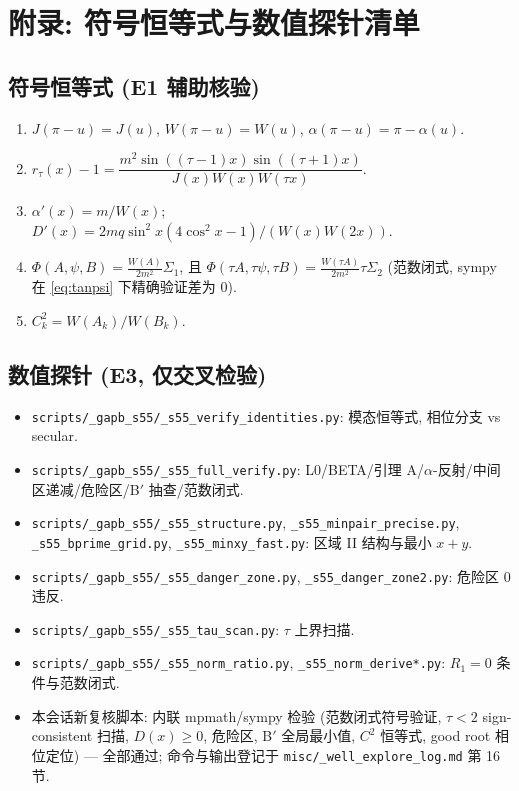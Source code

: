 \documentclass[UTF8]{ctexart}
\begin{document}
\section{附录: 符号恒等式与数值探针清单}\label{app:verify}

\subsection{符号恒等式 (E1 辅助核验)}

\begin{enumerate}
	\item $J(\pi-u)=J(u)$, $W(\pi-u)=W(u)$, $\alpha(\pi-u)=\pi-\alpha(u)$.
	\item $r_\tau(x)-1=\dfrac{m^2\sin((\tau-1)x)\sin((\tau+1)x)}{J(x)W(x)W(\tau x)}$.
	\item $\alpha'(x)=m/W(x)$; $D'(x)=2mq\sin^2x(4\cos^2x-1)/(W(x)W(2x))$.
	\item $\Phi(A,\psi,B)=\frac{W(A)}{2m^2}\Sigma_1$, 且
		$\Phi(\tau A,\tau\psi,\tau B)=\frac{W(\tau A)}{2m^2}\tau\Sigma_2$
		(范数闭式, sympy 在 \eqref{eq:tanpsi} 下精确验证差为 0).
	\item $C_k^2=W(A_k)/W(B_k)$.
\end{enumerate}

\subsection{数值探针 (E3, 仅交叉检验)}

\begin{itemize}
	\item \texttt{scripts/\_gapb\_s55/\_s55\_verify\_identities.py}: 模态恒等式,
		相位分支 vs secular.
	\item \texttt{scripts/\_gapb\_s55/\_s55\_full\_verify.py}: L0/BETA/引理
		A/$\alpha$-反射/中间区递减/危险区/B$'$ 抽查/范数闭式.
	\item \texttt{scripts/\_gapb\_s55/\_s55\_structure.py},
		\texttt{\_s55\_minpair\_precise.py}, \texttt{\_s55\_bprime\_grid.py},
		\texttt{\_s55\_minxy\_fast.py}: 区域 II 结构与最小 $x+y$.
	\item \texttt{scripts/\_gapb\_s55/\_s55\_danger\_zone.py},
		\texttt{\_s55\_danger\_zone2.py}: 危险区 0 违反.
	\item \texttt{scripts/\_gapb\_s55/\_s55\_tau\_scan.py}: $\tau$ 上界扫描.
	\item \texttt{scripts/\_gapb\_s55/\_s55\_norm\_ratio.py},
		\texttt{\_s55\_norm\_derive*.py}: $R_1=0$ 条件与范数闭式.
	\item 本会话新复核脚本: 内联 mpmath/sympy 检验 (范数闭式符号验证,
		$\tau<2$ sign-consistent 扫描, $D(x)\ge0$, 危险区, B$'$ 全局最小值,
		$C^2$ 恒等式, good root 相位定位) --- 全部通过; 命令与输出登记于
		\texttt{misc/\_well\_explore\_log.md} 第 16 节.
\end{itemize}
\end{document}
